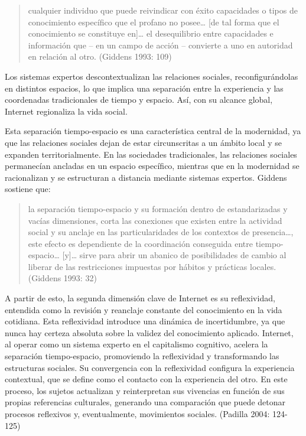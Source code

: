 \documentclass[
]{interact}
\begin{document}
\begin{quote}
cualquier individuo que puede reivindicar con éxito capacidades o tipos
de conocimiento específico que el profano no posee\ldots{} {[}de tal
forma que el conocimiento se constituye en{]}\ldots{} el desequilibrio
entre capacidades e información que -- en un campo de acción --
convierte a uno en autoridad en relación al otro. (Giddens 1993: 109)
\end{quote}

Los sistemas expertos descontextualizan las relaciones sociales,
reconfigurándolas en distintos espacios, lo que implica una separación
entre la experiencia y las coordenadas tradicionales de tiempo y
espacio. Así, con su alcance global, Internet regionaliza la vida
social.

Esta separación tiempo-espacio es una característica central de la
modernidad, ya que las relaciones sociales dejan de estar circunscritas
a un ámbito local y se expanden territorialmente. En las sociedades
tradicionales, las relaciones sociales permanecían ancladas en un
espacio específico, mientras que en la modernidad se racionalizan y se
estructuran a distancia mediante sistemas expertos. Giddens sostiene
que:

\begin{quote}
la separación tiempo-espacio y su formación dentro de estandarizadas y
vacías dimensiones, corta las conexiones que existen entre la actividad
social y su anclaje en las particularidades de los contextos de
presencia\ldots, este efecto es dependiente de la coordinación
conseguida entre tiempo-espacio\ldots{} {[}y{]}\ldots{} sirve para abrir
un abanico de posibilidades de cambio al liberar de las restricciones
impuestas por hábitos y prácticas locales. (Giddens 1993: 32)
\end{quote}

A partir de esto, la segunda dimensión clave de Internet es su
reflexividad, entendida como la revisión y reanclaje constante del
conocimiento en la vida cotidiana. Esta reflexividad introduce una
dinámica de incertidumbre, ya que nunca hay certeza absoluta sobre la
validez del conocimiento aplicado. Internet, al operar como un sistema
experto en el capitalismo cognitivo, acelera la separación
tiempo-espacio, promoviendo la reflexividad y transformando las
estructuras sociales. Su convergencia con la reflexividad configura la
experiencia contextual, que se define como el contacto con la
experiencia del otro. En este proceso, los sujetos actualizan y
reinterpretan sus vivencias en función de sus propias referencias
culturales, generando una comparación que puede detonar procesos
reflexivos y, eventualmente, movimientos sociales. (Padilla 2004:
124-125)
\end{document}
